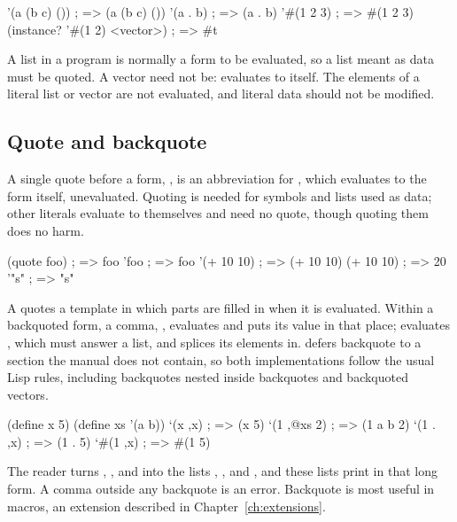 \begin{dylan}
'(a (b c) ())        ; => (a (b c) ())
'(a . b)             ; => (a . b)
'#(1 2 3)            ; => #(1 2 3)
(instance? '#(1 2) <vector>)   ; => #t
\end{dylan}

\noindent A list in a program is normally a form to be evaluated, so a list
meant as data must be quoted. A vector need not be: 
evaluates to itself. The elements of a literal list or vector are not
evaluated, and literal data should not be modified.

\subsection{Quote and backquote}\label{sec:syntax-quote}

A single quote before a form, , is an abbreviation for
, which evaluates to
the form itself, unevaluated. Quoting is needed for symbols and lists used
as data; other literals evaluate to themselves and need no quote, though
quoting them does no harm.

\begin{dylan}
(quote foo)          ; => foo
'foo                 ; => foo
'(+ 10 10)           ; => (+ 10 10)
(+ 10 10)            ; => 20
'"s"                 ; => "s"
\end{dylan}

A  quotes a template in which parts are filled in when it is
evaluated. Within a backquoted form, a comma, ,
evaluates  and puts its value in that place; 
evaluates , which must answer a list, and splices its elements
in.  defers backquote to a section the manual does not
contain, so both implementations follow the usual Lisp rules, including
backquotes nested inside backquotes and backquoted vectors.

\begin{dylan}
(define x 5)
(define xs '(a b))
`(x ,x)              ; => (x 5)
`(1 ,@xs 2)          ; => (1 a b 2)
`(1 . ,x)            ; => (1 . 5)
`#(1 ,x)             ; => #(1 5)
\end{dylan}

\noindent The reader turns , ,  and 
into the lists , , 
and , and these lists print in that long
form. A comma outside any backquote is an error. Backquote is most useful
in macros, an extension described in Chapter~\ref{ch:extensions}.

